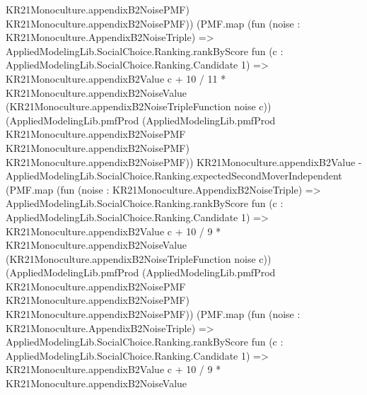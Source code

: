\documentclass[10pt]{article}
\begin{document}
\begin{ReviewVerbatim}
                                    KR21Monoculture.appendixB2NoisePMF)
                                  KR21Monoculture.appendixB2NoisePMF))
                              (PMF.map
                                (fun (noise : KR21Monoculture.AppendixB2NoiseTriple) =>
                                  AppliedModelingLib.SocialChoice.Ranking.rankByScore
                                    fun (c : AppliedModelingLib.SocialChoice.Ranking.Candidate 1) =>
                                    KR21Monoculture.appendixB2Value c +
                                      10 / 11 *
                                        KR21Monoculture.appendixB2NoiseValue
                                          (KR21Monoculture.appendixB2NoiseTripleFunction noise c))
                                (AppliedModelingLib.pmfProd
                                  (AppliedModelingLib.pmfProd KR21Monoculture.appendixB2NoisePMF
                                    KR21Monoculture.appendixB2NoisePMF)
                                  KR21Monoculture.appendixB2NoisePMF))
                              KR21Monoculture.appendixB2Value -
                            AppliedModelingLib.SocialChoice.Ranking.expectedSecondMoverIndependent
                              (PMF.map
                                (fun (noise : KR21Monoculture.AppendixB2NoiseTriple) =>
                                  AppliedModelingLib.SocialChoice.Ranking.rankByScore
                                    fun (c : AppliedModelingLib.SocialChoice.Ranking.Candidate 1) =>
                                    KR21Monoculture.appendixB2Value c +
                                      10 / 9 *
                                        KR21Monoculture.appendixB2NoiseValue
                                          (KR21Monoculture.appendixB2NoiseTripleFunction noise c))
                                (AppliedModelingLib.pmfProd
                                  (AppliedModelingLib.pmfProd KR21Monoculture.appendixB2NoisePMF
                                    KR21Monoculture.appendixB2NoisePMF)
                                  KR21Monoculture.appendixB2NoisePMF))
                              (PMF.map
                                (fun (noise : KR21Monoculture.AppendixB2NoiseTriple) =>
                                  AppliedModelingLib.SocialChoice.Ranking.rankByScore
                                    fun (c : AppliedModelingLib.SocialChoice.Ranking.Candidate 1) =>
                                    KR21Monoculture.appendixB2Value c +
                                      10 / 9 *
                                        KR21Monoculture.appendixB2NoiseValue

\end{ReviewVerbatim}
\end{document}
